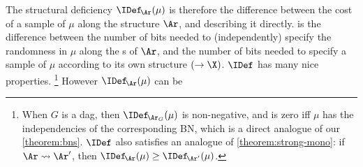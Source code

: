 {{    The structural deficiency $\IDef_{\!\Ar}(\mu)$ is
    therefore the difference between the cost of a sample of
        $\mu$ along the structure $\Ar$, and describing it directly.
}
is the difference between the number of bits needed to (independently) specify the randomness in $\mu$ along the \arc s of $\Ar$, and the number of bits needed to specify a sample of $\mu$ according to its own structure $(\to \X)$.
$\IDef$ has many nice properties.%
\footnote{
When $G$ is a dag, then $\IDef_{\!\Ar_G}(\mu)$
is non-negative, and
is zero iff $\mu$ has the independencies of the corresponding BN, 
which is a direct
analogue of our \cref{theorem:bns}.
$\IDef$ also
\ifvfull{}
\else
satisfies an analogue of \cref{theorem:strong-mono}: if $\Ar \rightsquigarrow \Ar'$, then $\IDef_{\!\Ar}(\mu) \ge \IDef_{\!\Ar'}(\mu)$.
\fi
}
%
%
However $\IDef_{\!\Ar}(\mu)$ can be
}
